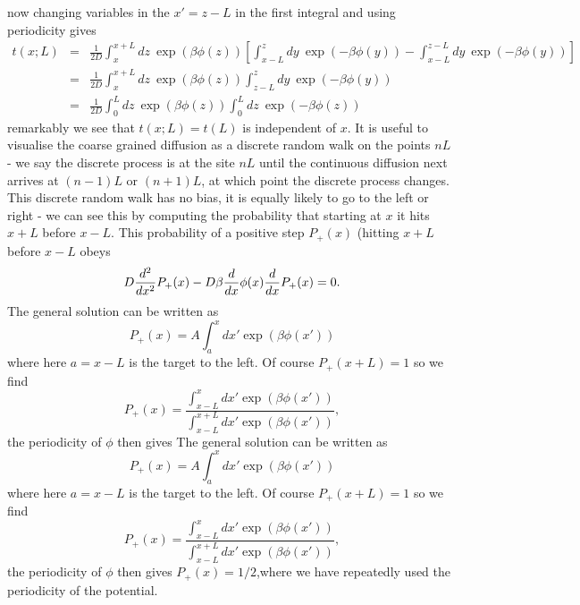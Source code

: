 \documentclass[11pt]{report}
\begin{document}
now changing variables in the $x'=z-L$ in the first integral and using periodicity gives
\begin{eqnarray}
t(x;L) &=& \frac{1}{2D} \int_{x}^{x+L}dz\ \exp\left(\beta\phi(z)\right)\left[\int^{z}_{x-L} dy\ \exp\left(-\beta
\phi(y)\right) -\int^{z-L}_{x-L} dy\ \exp\left(-\beta
\phi(y)\right)\right] \nonumber \\
&=& \frac{1}{2D} \int_{x}^{x+L}dz\ \exp\left(\beta\phi(z)\right)\int^{z}_{z-L} dy\ \exp\left(-\beta
\phi(y)\right) \nonumber \\
&=& \frac{1}{2D} \int_{0}^{L}dz\ \exp\left(\beta\phi(z)\right)\int^{L}_{0} dz\ \exp\left(-\beta
\phi(z)\right) \label{mfpt}
\end{eqnarray}
remarkably we see
that $t(x;L) = t(L)$ is independent of $x$. It is useful to visualise the coarse grained diffusion
as a discrete random walk on the points $nL$ - we say the discrete process is at the site
$nL$ until the continuous diffusion next arrives at $(n-1)L$ or $(n+1)L$, at which point the discrete process changes. This discrete random walk has no bias, it is equally likely to go to the left or right - we can see this by computing the probability that starting at $x$ it hits $x+L$ before $x-L$. This probability of a positive step $P_+(x)$ (hitting $x+L$ before $x-L$ obeys
\begin{equation}
D{d^2\over d x^2} P_+(x) - D\beta \frac{d}{d x}\phi(x) \frac{d}{d x}P_+(x) =0.
\end{equation}
The general solution can be written as
\begin{equation}
P_+(x)= A\int_a^x dx' \exp\left(\beta\phi(x')\right)
\end{equation}
where here  $a= x-L$ is the target to the left. Of course $P_+(x+L) =1$ so we find
\begin{equation}
P_+(x)= \frac{\int_{x-L}^x dx' \exp\left(\beta\phi(x')\right)}{\int_{x-L}^{x+L} dx' \exp\left(\beta\phi(x')\right)},
\end{equation}
the periodicity of $\phi$ then gives The general solution can be written as
\begin{equation}
P_+(x)= A\int_a^x dx' \exp\left(\beta\phi(x')\right)
\end{equation}
where here  $a= x-L$ is the target to the left. Of course $P_+(x+L) =1$ so we find
\begin{equation}
P_+(x)= \frac{\int_{x-L}^x dx' \exp\left(\beta\phi(x')\right)}{\int_{x-L}^{x+L} dx' \exp\left(\beta\phi(x')\right)},
\end{equation}
the periodicity of $\phi$ then gives $P_+(x) = 1/2$,where we have repeatedly used the periodicity of the potential.
\end{document}
